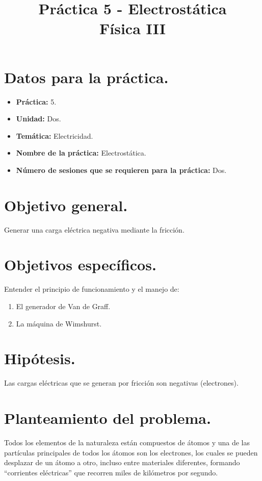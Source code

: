 \documentclass[14pt]{extarticle}
\title{\vspace*{-2cm} Práctica 5 - Electrostática \\  Física III\vspace{-5ex}}
\date{}
\begin{document}
\maketitle

\section{Datos para la práctica.}

\begin{itemize}
\itemsep0em 
\item  \textbf{Práctica:} 5.
\item \textbf{Unidad:} Dos.
\item \textbf{Temática:} Electricidad.
\item \textbf{Nombre de la práctica:} Electrostática.
\item \textbf{Número de sesiones que se requieren para la práctica:} Dos.
\end{itemize}

\section{Objetivo general.}

Generar una carga eléctrica negativa mediante la fricción.

\section{Objetivos específicos.}

Entender el principio de funcionamiento y el manejo de:
\begin{enumerate}
\item El generador de Van de Graff.
\item La máquina de Wimshurst.
\end{enumerate}

\section{Hipótesis.}

Las cargas eléctricas que se generan por fricción son negativas (electrones).

\section{Planteamiento del problema.}

Todos los elementos de la naturaleza están compuestos de átomos y una de las partículas principales de todos los átomos son los electrones, los cuales se pueden desplazar de un átomo a otro, incluso entre materiales diferentes, formando \enquote{corrientes eléctricas} que recorren miles de kilómetros por segundo.
\end{document}
